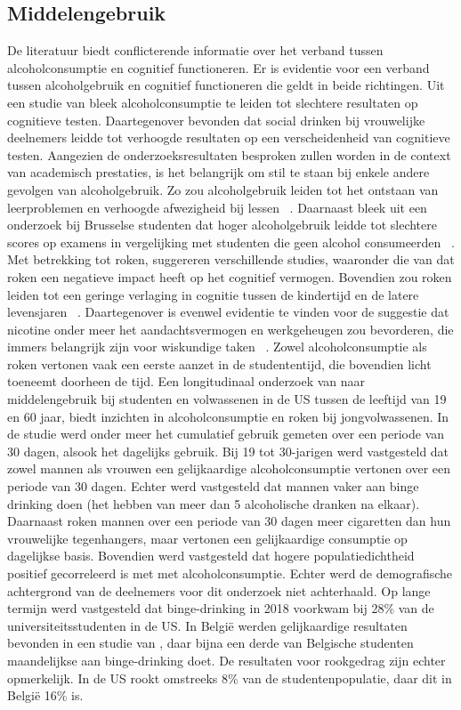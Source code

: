 \documentclass{hogent-article}
\begin{document}
\subsection{Middelengebruik}
De literatuur biedt conflicterende informatie over het verband tussen alcoholconsumptie en cognitief functioneren. Er is evidentie voor een verband tussen alcoholgebruik en cognitief functioneren die geldt in beide richtingen. Uit een studie van \textcite{Parker1984} bleek alcoholconsumptie te leiden tot slechtere resultaten op cognitieve testen. Daartegenover bevonden \textcite{Bates1990} dat social drinken bij vrouwelijke deelnemers leidde tot verhoogde resultaten op een verscheidenheid van cognitieve testen. Aangezien de onderzoeksresultaten besproken zullen worden in de context van academisch prestaties, is het belangrijk om stil te staan bij enkele andere gevolgen van alcoholgebruik. Zo zou alcoholgebruik leiden tot het ontstaan van leerproblemen en verhoogde afwezigheid bij lessen ~\autocite{Balsa2011}. Daarnaast bleek uit een onderzoek bij Brusselse studenten dat hoger alcoholgebruik leidde tot slechtere scores op examens in vergelijking met studenten die geen alcohol consumeerden ~\autocite{Dielens2013}.
Met betrekking tot roken, suggereren verschillende studies, waaronder die van \textcite{Kalmijn2002} dat roken een negatieve impact heeft op het cognitief vermogen. Bovendien zou roken leiden tot een geringe verlaging in cognitie tussen de kindertijd en de latere levensjaren ~\autocite{Whalley2005}. Daartegenover is evenwel evidentie te vinden voor de suggestie dat nicotine onder meer het aandachtsvermogen en werkgeheugen zou bevorderen, die immers belangrijk zijn voor wiskundige taken ~\autocite{Kumari2003}.
Zowel alcoholconsumptie als roken vertonen vaak een eerste aanzet in de studententijd, die bovendien licht toeneemt doorheen de tijd. Een longitudinaal onderzoek van \textcite{Schulenberg2020} naar middelengebruik bij studenten en volwassenen in de US tussen de leeftijd van 19 en 60 jaar, biedt inzichten in alcoholconsumptie en roken bij jongvolwassenen. In de studie werd onder meer het cumulatief gebruik gemeten over een periode van 30 dagen, alsook het dagelijks gebruik. Bij 19 tot 30-jarigen werd vastgesteld dat zowel mannen als vrouwen een gelijkaardige alcoholconsumptie vertonen over een periode van 30 dagen. Echter werd vastgesteld dat mannen vaker aan binge drinking doen (het hebben van meer dan 5 alcoholische dranken na elkaar). Daarnaast roken mannen over een periode van 30 dagen meer cigaretten dan hun vrouwelijke tegenhangers, maar vertonen een gelijkaardige consumptie op dagelijkse basis. Bovendien werd vastgesteld dat hogere populatiedichtheid positief gecorreleerd is met met alcoholconsumptie. Echter werd de demografische achtergrond van de deelnemers voor dit onderzoek niet achterhaald.
Op lange termijn werd vastgesteld dat binge-drinking in 2018 voorkwam bij 28\% van de universiteitsstudenten in de US. In België werden gelijkaardige resultaten bevonden in een studie van \textcite{VanDamme2018}, daar bijna een derde van Belgische studenten maandelijkse aan binge-drinking doet. De resultaten voor rookgedrag zijn echter opmerkelijk. In de US rookt omstreeks 8\% van de studentenpopulatie, daar dit in België 16\% is.
\end{document}
